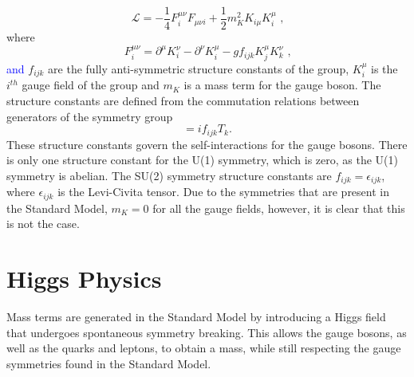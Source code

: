 %
\begin{equation}
\mathcal{L} = -\frac{1}{4}F^{{\mu}{\nu}}_{i}F_{{\mu}{\nu}{i}} + \frac{1}{2}m_{K}^{2}K_{i\mu}K^{\mu}_{i} \text{ ,} 
\end{equation}
%
\noindent where
%
\begin{equation}
F^{{\mu}{\nu}}_{i} = \partial^{\mu}K^{\nu}_{i} - \partial^{\nu}K^{\mu}_{i} - gf_{ijk}K^{\mu}_{j}K^{\nu}_{k} \text{ ,} 
\end{equation}
%
\noindent \textcolor{blue}{and} $f_{ijk}$ are the fully anti-symmetric structure constants of the group, $K^{\mu}_{i}$ is the $i^{th}$ gauge field of the group and $m_{K}$ is a mass term for the gauge boson.  The structure constants are defined from the commutation relations between generators of the symmetry group
%
\begin{equation}
[T_{i},T_{j}] = if_{ijk}T_{k} \text{.} 
\end{equation}
%
\noindent These structure constants govern the self-interactions for the gauge bosons.  There is only one structure constant for the U(1) symmetry, which is zero, as the U(1) symmetry is abelian.  The SU(2) symmetry structure constants are $f_{ijk} = \epsilon_{ijk}$, where $\epsilon_{ijk}$ is the Levi-Civita tensor.  Due to the symmetries that are present in the Standard Model, $m_{K} = 0$ for all the gauge fields, however, it is clear that this is not the case.  


\section{Higgs Physics}
\label{sec:higgsphysics}
Mass terms are generated in the Standard Model by introducing a Higgs field that undergoes spontaneous symmetry breaking.  This allows the gauge bosons, as well as the quarks and leptons, to obtain a mass, while still respecting the gauge symmetries found in the Standard Model.  


